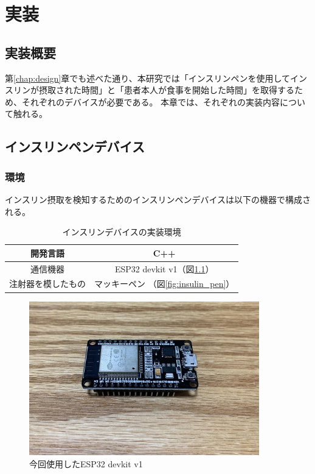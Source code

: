 \chapter{実装}
\label{chap:implementation}

\section{実装概要}

第\ref{chap:design}章でも述べた通り、本研究では「インスリンペンを使用してインスリンが摂取された時間」と「患者本人が食事を開始した時間」を取得するため、それぞれのデバイスが必要である。
本章では、それぞれの実装内容について触れる。

\section{インスリンペンデバイス}
\label{section:insulin_pen_device}

\subsection{環境}

インスリン摂取を検知するためのインスリンペンデバイスは以下の機器で構成される。

\begin{table}[htbp]
  \caption{インスリンデバイスの実装環境}
  \label{tb:insulin-device}
  \begin{center}
    \begin{tabular}{|c||c|}
      \hline
      開発言語  & C++ \\\hline
      通信機器  & ESP32 devkit v1（図\ref{fig:esp32}） \\\hline
      注射器を模したもの & マッキーペン （図\ref{fig:insulin_pen}）\\\hline
    \end{tabular}
  \end{center}
\end{table}

\begin{figure}[htbp]
  \caption{今回使用したESP32 devkit v1}
  \label{fig:esp32}
  \begin{center}
    \includegraphics[bb=0 0 1300 1100,width=10cm]{assets/esp32.jpg}
  \end{center}
\end{figure}

